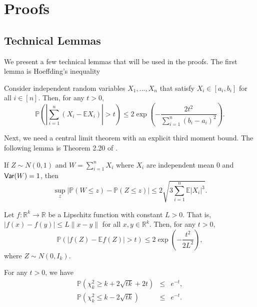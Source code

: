 


\section{Proofs}
\label{sec:proof}

\subsection{Technical Lemmas}

We present a few technical lemmas that will be used in the proofs. The first lemma is Hoeffding's inequality
\begin{lemma}\label{lem:hoeffding}
Consider independent random variables $X_1,...,X_n$ that satisfy $X_i\in[a_i,b_i]$ for all $i\in[n]$. Then, for any $t>0$,
$$\mathbb{P}\left(\left|\sum_{i=1}^n(X_i-\mathbb{E}X_i)\right|>t\right) \leq 2\exp\left(-\frac{2t^2}{\sum_{i=1}^n(b_i-a_i)^2}\right).$$
\end{lemma}

Next, we need a central limit theorem with an explicit third moment bound. The following lemma is Theorem 2.20 of \cite{ross2007second}.
\begin{lemma}\label{lem:stein}
If $Z\sim N(0,1)$ and $W=\sum_{i=1}^nX_i$ where $X_i$ are independent mean $0$ and $\textsf{Var}(W)=1$, then
$$\sup_z\left|\mathbb{P}(W\leq z)-\mathbb{P}(Z\leq z)\right|\leq 2\sqrt{3\sum_{i=1}^n\mathbb{E}|X_i|^3}.$$
\end{lemma}


\begin{lemma}\label{lem:talagrand}
Let $f:\mathbb{R}^k\rightarrow\mathbb{R}$ be a Lipschitz function with constant $L>0$. That is, $|f(x)-f(y)|\leq L\|x-y\|$ for all $x,y\in\mathbb{R}^k$. Then, for any $t>0$,
$$\mathbb{P}\left(|f(Z)-\mathbb{E}f(Z)|>t\right)\leq 2\exp\left(-\frac{t^2}{2L^2}\right),$$
where $Z\sim N(0,I_k)$.
\end{lemma}

\begin{lemma}\label{lem:chi-squared}
For any $t>0$, we have
\begin{eqnarray*}
\mathbb{P}\left(\chi_k^2\geq k+2\sqrt{tk}+2t\right) &\leq& e^{-t}, \\
\mathbb{P}\left(\chi_k^2\leq k-2\sqrt{tk}\right) &\leq& e^{-t}.
\end{eqnarray*}
\end{lemma}

